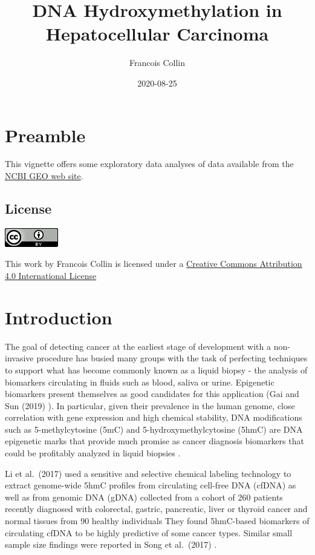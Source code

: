 \documentclass[
]{book}
\title{DNA Hydroxymethylation in Hepatocellular Carcinoma}
\author{Francois Collin}
\date{2020-08-25}
\begin{document}
\maketitle

{
\setcounter{tocdepth}{1}
\tableofcontents
}
\hypertarget{index}{%
\chapter*{Preamble}\label{index}}

This vignette offers some exploratory data analyses of data available from
the \href{https://www.ncbi.nlm.nih.gov/geo/}{NCBI GEO web site}.

\hypertarget{license}{%
\section*{License}\label{license}}

\includegraphics{CC_4_0.png}

This work by Francois Collin is licensed under a
\href{http://creativecommons.org/licenses/by/4.0/}{Creative Commons Attribution 4.0 International License}

\hypertarget{intro}{%
\chapter{Introduction}\label{intro}}

The goal of detecting
cancer at the earliest stage of development with a non-invasive procedure
has busied many groups with the task of perfecting techniques to support
what has become commonly known as a
liquid biopsy - the analysis of biomarkers circulating in fluids such as blood,
saliva or urine. Epigenetic biomarkers present themselves as good candidates for this application
(Gai and Sun (2019) \citep{Gai:2019aa}). In particular,
given their prevalence in the human genome,
close correlation with gene expression and high chemical stability,
DNA modifications such as 5-methylcytosine (5mC) and 5-hydroxymethylcytosine (5hmC)
are DNA epigenetic marks that provide much promise as
cancer diagnosis biomarkers that could be profitably analyzed in liquid biopsies
\citep{Cai:2019aa, Li:2017aa, Song:2017aa, Collin:2018aa}.

Li et al.~(2017) \citep{Li:2017aa} used a sensitive and selective chemical labeling technology
to extract genome-wide 5hmC profiles from circulating cell-free DNA (cfDNA)
as well as from genomic DNA (gDNA)
collected from a cohort of 260 patients recently diagnosed with colorectal,
gastric, pancreatic, liver or thyroid cancer and normal tissues from 90 healthy individuals
They found 5hmC-based biomarkers of circulating cfDNA to be highly predictive of some cancer types.
Similar small sample size findings were reported in Song et al.~(2017) \citep{Song:2017aa}.
\end{document}
